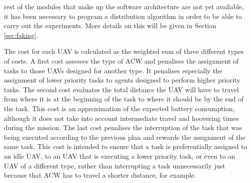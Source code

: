 \documentclass[fontsize=11pt, English=false, Español=true, Myfinal=true, twoside, numbers=noenddot]{scrbook}
\begin{document}
{rest of the modules that make up the software architecture are not yet available, it has been necessary to program a distribution algorithm in order to be able to carry out the experiments. More details on this will be given in Section \ref{sec:faking}.

The cost for each \gls{UAV} is calculated as the weighted sum of three different types of costs. A first cost assesses the type of \gls{ACW} and penalises the assignment of tasks to those \glspl{UAV} designed for another type. It penalises especially the assignment of lower priority tasks to agents designed to perform higher priority tasks. The second cost evaluates the total distance the \gls{UAV} will have to travel from where it is at the beginning of the task to where it should be by the end of the task. This cost is an approximation of the expected battery consumption, although it does not take into account intermediate travel and hoovering times during the mission. The last cost penalises the interruption of the task that was being executed according to the previous plan and rewards the assignment of the same task. This cost is intended to ensure that a task is preferentially assigned to an idle \gls{UAV}, to an \gls{UAV} that is executing a lower priority task, or even to an \gls{UAV} of a different type, rather than interrupting a task unnecessarily just because that \gls{ACW} has to travel a shorter distance, for example.

}
\end{document}
